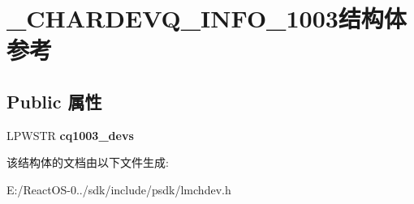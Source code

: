 \hypertarget{struct___c_h_a_r_d_e_v_q___i_n_f_o__1003}{}\section{\+\_\+\+C\+H\+A\+R\+D\+E\+V\+Q\+\_\+\+I\+N\+F\+O\+\_\+1003结构体 参考}
\label{struct___c_h_a_r_d_e_v_q___i_n_f_o__1003}
\subsection*{Public 属性}
\begin{DoxyCompactItemize}
\item 
\mbox{\label{struct___c_h_a_r_d_e_v_q___i_n_f_o__1003_a8147fc0752e1bab4cd051f80c99e2328}} 
L\+P\+W\+S\+TR {\bfseries cq1003\+\_\+devs}
\end{DoxyCompactItemize}


该结构体的文档由以下文件生成\+:\begin{DoxyCompactItemize}
\item 
E\+:/\+React\+O\+S-\/0../sdk/include/psdk/lmchdev.\+h\end{DoxyCompactItemize}
